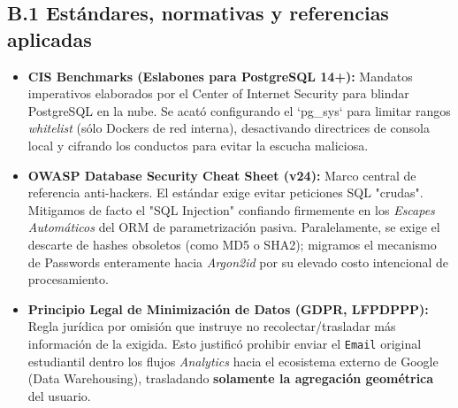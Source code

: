 \documentclass[12pt,a4paper]{article}
\begin{document}
\subsection{B.1 Estándares, normativas y referencias aplicadas}
\begin{itemize}
    \item \textbf{CIS Benchmarks (Eslabones para PostgreSQL 14+):} Mandatos imperativos elaborados por el Center of Internet Security para blindar PostgreSQL en la nube. Se acató configurando el `pg\_sys` para limitar rangos \textit{whitelist} (sólo Dockers de red interna), desactivando directrices de consola local y cifrando los conductos para evitar la escucha maliciosa.
    \item \textbf{OWASP Database Security Cheat Sheet (v24):} Marco central de referencia anti-hackers. El estándar exige evitar peticiones SQL "crudas". Mitigamos de facto el "SQL Injection" confiando firmemente en los \textit{Escapes Automáticos} del ORM de parametrización pasiva. Paralelamente, se exige el descarte de hashes obsoletos (como MD5 o SHA2); migramos el mecanismo de Passwords enteramente hacia \textit{Argon2id} por su elevado costo intencional de procesamiento.
    \item \textbf{Principio Legal de Minimización de Datos (GDPR, LFPDPPP):} Regla jurídica por omisión que instruye no recolectar/trasladar más información de la exigida. Esto justificó prohibir enviar el \texttt{Email} original estudiantil dentro los flujos \textit{Analytics} hacia el ecosistema externo de Google (Data Warehousing), trasladando \textbf{solamente la agregación geométrica} del usuario.
\end{itemize}
\end{document}

